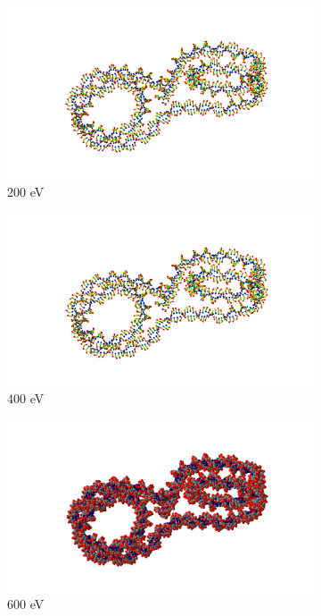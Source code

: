 \begin{figure}
\centering
\begin{subfigure}{.5\textwidth}
  \centering
  \includegraphics[width=.78\linewidth]{./Figures/baresi.png}
  \caption{200 eV}
  \label{fig:sub11}
\end{subfigure}%
\begin{subfigure}{.5\textwidth}
  \centering
  \includegraphics[width=.78\linewidth]{./Figures/baresi.png}
  \caption{400 eV}
  \label{fig:sub22}
\end{subfigure}
\begin{subfigure}{.5\textwidth}
  \centering
  \includegraphics[width=.78\linewidth]{./Figures/bavdw.png}
  \caption{600 eV}
  \label{fig:sub33}
\end{subfigure}%
\begin{subfigure}{.5\textwidth}
  \centering

\end{subfigure}
\end{figure}
